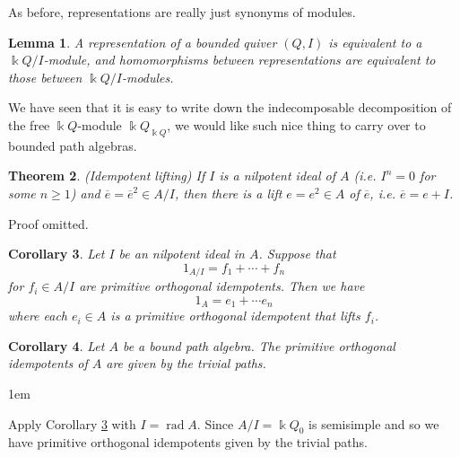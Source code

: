 \documentclass[11pt,a4paper]{article}
\makeatletter
\numberwithin{equation}{section}
\renewenvironment{proof}[1][\proofname]{\par
    \pushQED{\qed}%
    \normalfont \topsep0\p@\@plus6\p@ \labelsep1em\relax
    \trivlist
    \item[\hskip\labelsep\indent
        \bfseries #1]\ignorespaces
    \mbox{}
}{
    \popQED\endtrivlist\@endpefalse
}
\theoremstyle{all}
\newtheorem{theorem}{Theorem}[section]
\newtheorem{lemma}[theorem]{Lemma}
\newtheorem{corollary}[theorem]{Corollary}
\theoremstyle{remark}
\newcommand{\rad}{\operatorname{rad}\nolimits}
\newcommand{\defn}[1]{\textsl{\color{darkblue} #1}}
\makeatother
\begin{document}
As before, representations are really just synonyms of modules.
\begin{lemma}
A representation of a bounded quiver $(Q,I)$ is equivalent to a $\Bbbk Q/I$-module, and homomorphisms between representations are equivalent to those between $\Bbbk Q/I$-modules.
\end{lemma}


We have seen that it is easy to write down the indecomposable decomposition of the free $\Bbbk Q$-module $\Bbbk Q_{\Bbbk Q}$, we would like such nice thing to carry over to bounded path algebras.

\begin{theorem}(Idempotent lifting)
If $I$ is a nilpotent ideal of $A$ (i.e. $I^n=0$ for some $n\geq 1$) and $\overline{e}=\overline{e}^2\in A/I$, then there is a \defn{lift} $e=e^2\in A$ of $\overline{e}$, i.e. $\overline{e}=e+I$.
\end{theorem}
Proof omitted.  


\begin{corollary}\label{cor:idem lifting}
Let $I$ be an nilpotent ideal in $A$.  Suppose that
\[
1_{A/I}=f_1+\cdots + f_n
\]
for $f_i\in A/I$ are primitive orthogonal idempotents.
Then we have
\[
1_A= e_1+\cdots e_n
\]
where each $e_i\in A$ is a primitive orthogonal idempotent that lifts $f_i$.
\end{corollary}
%
%

\begin{corollary}\label{cor:prim idem on bound path algebra}
Let $A$ be a bound path algebra.
The primitive orthogonal idempotents of $A$ are given by the trivial paths.
\end{corollary}
\begin{proof}
Apply Corollary \ref{cor:idem lifting} with $I=\rad A$.  Since $A/I=\Bbbk Q_0$ is semisimple and so we have primitive orthogonal idempotents given by the trivial paths.
\end{proof}
\end{document}
